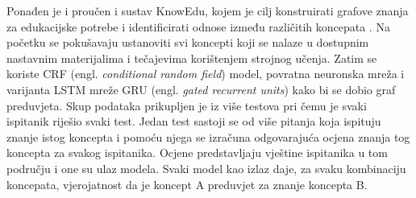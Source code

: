 \newline
\newline
Ponađen je i proučen i sustav KnowEdu, kojem je cilj konstruirati grafove znanja za edukacijske potrebe i identificirati odnose između različitih koncepata \citep{knowedu}.\newline
Na početku se pokušavaju ustanoviti svi koncepti koji se nalaze u dostupnim nastavnim materijalima i tečajevima korištenjem strojnog učenja. Zatim se koriste CRF (engl. \textit{conditional random field}) model, povratna neuronska mreža i varijanta LSTM mreže GRU (engl. \textit{gated recurrent units}) kako bi se dobio graf preduvjeta. Skup podataka prikupljen je iz više testova pri čemu je svaki ispitanik riješio svaki test. Jedan test sastoji se od više pitanja koja ispituju znanje istog koncepta i pomoću njega se izračuna odgovarajuća ocjena znanja tog koncepta za svakog ispitanika. Ocjene predstavljaju vještine ispitanika u tom području i one su ulaz modela. Svaki model kao izlaz daje, za svaku kombinaciju koncepata, vjerojatnost da je koncept A preduvjet za znanje koncepta B.